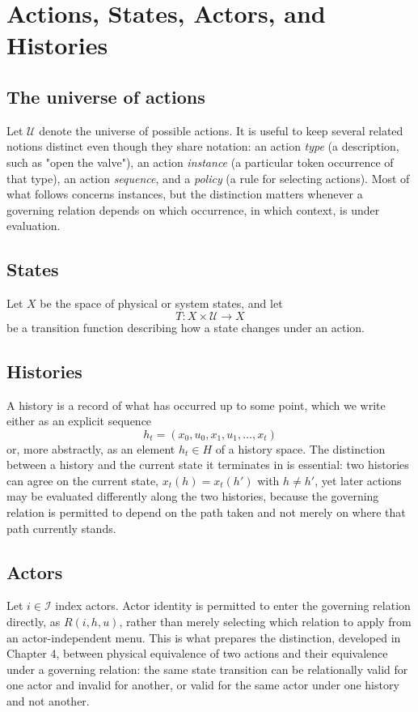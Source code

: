 \documentclass[11pt]{report}
\theoremstyle{definition}
\theoremstyle{plain}
\newcommand{\Uni}{\mathcal{U}}
\newcommand{\Ii}{\mathcal{I}}
\begin{document}
\chapter{Actions, States, Actors, and Histories}

\section{The universe of actions}
Let $\Uni$ denote the universe of possible actions. It is useful to keep several related notions distinct even though they share notation: an action \emph{type} (a description, such as "open the valve"), an action \emph{instance} (a particular token occurrence of that type), an action \emph{sequence}, and a \emph{policy} (a rule for selecting actions). Most of what follows concerns instances, but the distinction matters whenever a governing relation depends on which occurrence, in which context, is under evaluation.

\section{States}
Let $X$ be the space of physical or system states, and let
\[
T: X \times \Uni \to X
\]
be a transition function describing how a state changes under an action.

\section{Histories}
A history is a record of what has occurred up to some point, which we write either as an explicit sequence
\[
h_t = (x_0, u_0, x_1, u_1, \ldots, x_t)
\]
or, more abstractly, as an element $h_t \in H$ of a history space. The distinction between a history and the current state it terminates in is essential: two histories can agree on the current state, $x_t(h) = x_t(h')$ with $h \neq h'$, yet later actions may be evaluated differently along the two histories, because the governing relation is permitted to depend on the path taken and not merely on where that path currently stands.

\section{Actors}
Let $i \in \Ii$ index actors. Actor identity is permitted to enter the governing relation directly, as $R(i,h,u)$, rather than merely selecting which relation to apply from an actor-independent menu. This is what prepares the distinction, developed in Chapter 4, between physical equivalence of two actions and their equivalence under a governing relation: the same state transition can be relationally valid for one actor and invalid for another, or valid for the same actor under one history and not another.
\end{document}
